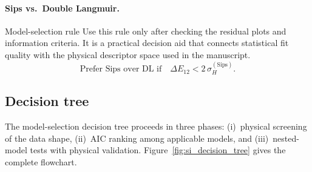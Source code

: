 \documentclass[journal=jacsat,manuscript=article]{achemso}
\begin{document}
\paragraph{Sips vs.\ Double Langmuir.}
\begin{bluebox}{Model-selection rule}
	Use this rule only after checking the residual plots and information criteria. It is a practical decision aid that connects statistical fit quality with the physical descriptor space used in the manuscript.
\begin{equation}
	\text{Prefer Sips over DL if}\quad
		\Delta E_{12} < 2\,\sigma_H^{\mathrm{(Sips)}}.
	\label{eq:si_criterion_SvsDL}
\end{equation}
\end{bluebox}

\subsection{Decision tree}
\label{sec:si_decision_tree}

The model-selection decision tree proceeds in three phases:
(i)~physical screening of the data shape,
(ii)~AIC ranking among applicable models, and
(iii)~nested-model tests with physical validation.
Figure~\ref{fig:si_decision_tree} gives the complete flowchart.
\end{document}
